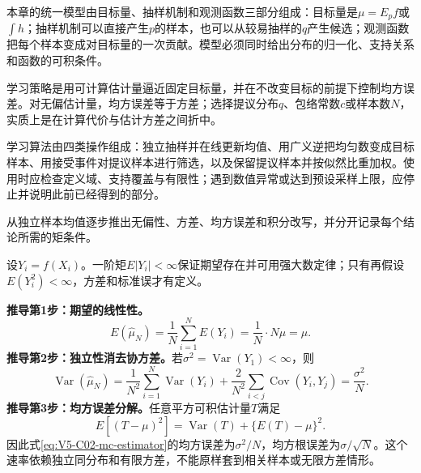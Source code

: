 \label{struct:V5-C02-CH08}
本章的统一模型由目标量、抽样机制和观测函数三部分组成：目标量是$\mu=E_p f$或$\int h$；抽样机制可以直接产生$p$的样本，也可以从较易抽样的$q$产生候选；观测函数把每个样本变成对目标量的一次贡献。模型必须同时给出分布的归一化、支持关系和函数的可积条件。

\label{struct:V5-C02-CH09}
学习策略是用可计算估计量逼近固定目标量，并在不改变目标的前提下控制均方误差。对无偏估计量，均方误差等于方差；选择提议分布$q$、包络常数$c$或样本数$N$，实质上是在计算代价与估计方差之间折中。

\label{struct:V5-C02-CH10}
学习算法由四类操作组成：独立抽样并在线更新均值、用广义逆把均匀数变成目标样本、用接受事件对提议样本进行筛选，以及保留提议样本并按似然比重加权。使用时应检查定义域、支持覆盖与有限性；遇到数值异常或达到预设采样上限，应停止并说明此前已经得到的部分。

\label{struct:V5-C02-CH11}

\begin{derivationgoalbox}
从独立样本均值逐步推出无偏性、方差、均方误差和积分改写，并分开记录每个结论所需的矩条件。
\end{derivationgoalbox}
\begin{derivationprepbox}
设$Y_i=f(X_i)$。一阶矩$E|Y_i|<\infty$保证期望存在并可用强大数定律；只有再假设$E(Y_i^2)<\infty$，方差和标准误才有定义。
\end{derivationprepbox}
\textbf{推导第1步：期望的线性性。}
\[
E(\widehat\mu_N)=\frac1N\sum_{i=1}^NE(Y_i)=\frac1N\cdot N\mu=\mu.
\]
\textbf{推导第2步：独立性消去协方差。}若$\sigma^2=\operatorname{Var}(Y_1)<\infty$，则
\begin{equation}\label{eq:V5-C02-mc-variance}
\operatorname{Var}(\widehat\mu_N)
=\frac1{N^2}\sum_{i=1}^N\operatorname{Var}(Y_i)
+\frac2{N^2}\sum_{i<j}\operatorname{Cov}(Y_i,Y_j)
=\frac{\sigma^2}{N}.
\end{equation}
\textbf{推导第3步：均方误差分解。}任意平方可积估计量$T$满足
\begin{equation}\label{eq:V5-C02-mse-decomposition}
E[(T-\mu)^2]=\operatorname{Var}(T)+\{E(T)-\mu\}^2.
\end{equation}
因此式\eqref{eq:V5-C02-mc-estimator}的均方误差为$\sigma^2/N$，均方根误差为$\sigma/\sqrt N$。这个速率依赖独立同分布和有限方差，不能原样套到相关样本或无限方差情形。

